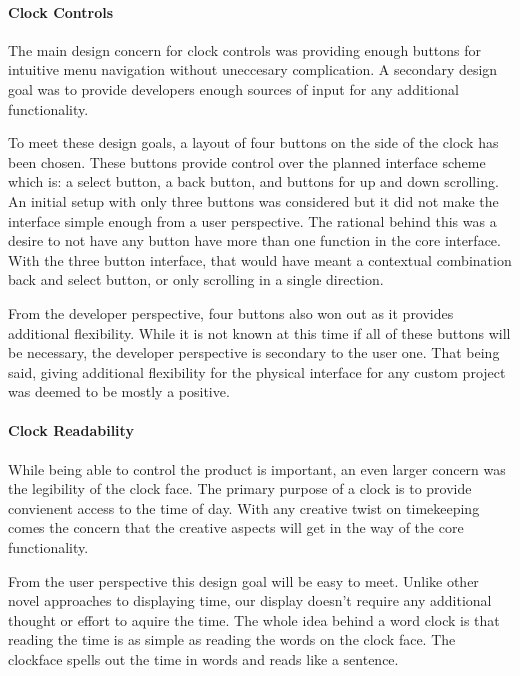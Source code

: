 \documentclass[onecolumn, draftclsnofoot,10pt, compsoc]{IEEEtran}
\begin{document}
\paragraph{Clock Controls}

\vspace{2mm} The main design concern for clock controls was providing enough buttons for intuitive menu navigation without uneccesary complication.
A secondary design goal was to provide developers enough sources of input for any additional functionality.

\vspace{2mm} To meet these design goals, a layout of four buttons on the side of the clock has been chosen.
These buttons provide control over the planned interface scheme which is: a select button, a back button, and buttons for up and down scrolling.
An initial setup with only three buttons was considered but it did not make the interface simple enough from a user perspective.
The rational behind this was a desire to not have any button have more than one function in the core interface.
With the three button interface, that would have meant a contextual combination back and select button, or only scrolling in a single direction.

\vspace{2mm} From the developer perspective, four buttons also won out as it provides additional flexibility.
While it is not known at this time if all of these buttons will be necessary, the developer perspective is secondary to the user one.
That being said, giving additional flexibility for the physical interface for any custom project was deemed to be mostly a positive.
\vspace{1mm}
\paragraph{Clock Readability}

\vspace{2mm} While being able to control the product is important, an even larger concern was the legibility of the clock face.
The primary purpose of a clock is to provide convienent access to the time of day.
With any creative twist on timekeeping comes the concern that the creative aspects will get in the way of the core functionality.

\vspace{2mm} From the user perspective this design goal will be easy to meet.
Unlike other novel approaches to displaying time, our display doesn't require any additional thought or effort to aquire the time.
The whole idea behind a word clock is that reading the time is as simple as reading the words on the clock face.
The clockface spells out the time in words and reads like a sentence.
\end{document}
